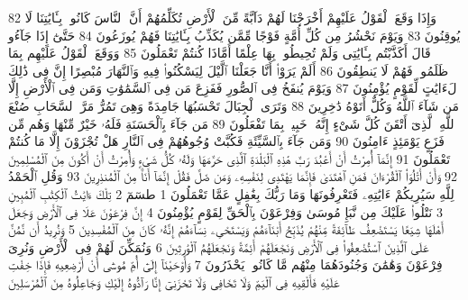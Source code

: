 {\tiny\colorbox{cl_aya}{82}} وَإِذَا وَقَعَ ٱلْقَوْلُ عَلَيْهِمْ أَخْرَجْنَا لَهُمْ دَآبَّةً مِّنَ ٱلْأَرْضِ تُكَلِّمُهُمْ أَنَّ ٱلنَّاسَ كَانُوا۟ بِـَٔايَٰتِنَا لَا يُوقِنُونَ
{\tiny\colorbox{cl_aya}{83}} وَيَوْمَ نَحْشُرُ مِن كُلِّ أُمَّةٍ فَوْجًا مِّمَّن يُكَذِّبُ بِـَٔايَٰتِنَا فَهُمْ يُوزَعُونَ
{\tiny\colorbox{cl_aya}{84}} حَتَّىٰٓ إِذَا جَآءُو قَالَ أَكَذَّبْتُم بِـَٔايَٰتِى وَلَمْ تُحِيطُوا۟ بِهَا عِلْمًا أَمَّاذَا كُنتُمْ تَعْمَلُونَ
{\tiny\colorbox{cl_aya}{85}} وَوَقَعَ ٱلْقَوْلُ عَلَيْهِم بِمَا ظَلَمُوا۟ فَهُمْ لَا يَنطِقُونَ
{\tiny\colorbox{cl_aya}{86}} أَلَمْ يَرَوْا۟ أَنَّا جَعَلْنَا ٱلَّيْلَ لِيَسْكُنُوا۟ فِيهِ وَٱلنَّهَارَ مُبْصِرًا إِنَّ فِى ذَٰلِكَ لَءَايَٰتٍ لِّقَوْمٍ يُؤْمِنُونَ
{\tiny\colorbox{cl_aya}{87}} وَيَوْمَ يُنفَخُ فِى ٱلصُّورِ فَفَزِعَ مَن فِى ٱلسَّمَٰوَٰتِ وَمَن فِى ٱلْأَرْضِ إِلَّا مَن شَآءَ ٱللَّهُ وَكُلٌّ أَتَوْهُ دَٰخِرِينَ
{\tiny\colorbox{cl_aya}{88}} وَتَرَى ٱلْجِبَالَ تَحْسَبُهَا جَامِدَةً وَهِىَ تَمُرُّ مَرَّ ٱلسَّحَابِ صُنْعَ ٱللَّهِ ٱلَّذِىٓ أَتْقَنَ كُلَّ شَىْءٍ إِنَّهُۥ خَبِيرٌۢ بِمَا تَفْعَلُونَ
{\tiny\colorbox{cl_aya}{89}} مَن جَآءَ بِٱلْحَسَنَةِ فَلَهُۥ خَيْرٌ مِّنْهَا وَهُم مِّن فَزَعٍ يَوْمَئِذٍ ءَامِنُونَ
{\tiny\colorbox{cl_aya}{90}} وَمَن جَآءَ بِٱلسَّيِّئَةِ فَكُبَّتْ وُجُوهُهُمْ فِى ٱلنَّارِ هَلْ تُجْزَوْنَ إِلَّا مَا كُنتُمْ تَعْمَلُونَ
{\tiny\colorbox{cl_aya}{91}} إِنَّمَآ أُمِرْتُ أَنْ أَعْبُدَ رَبَّ هَٰذِهِ ٱلْبَلْدَةِ ٱلَّذِى حَرَّمَهَا وَلَهُۥ كُلُّ شَىْءٍ وَأُمِرْتُ أَنْ أَكُونَ مِنَ ٱلْمُسْلِمِينَ
{\tiny\colorbox{cl_aya}{92}} وَأَنْ أَتْلُوَا۟ ٱلْقُرْءَانَ فَمَنِ ٱهْتَدَىٰ فَإِنَّمَا يَهْتَدِى لِنَفْسِهِۦ وَمَن ضَلَّ فَقُلْ إِنَّمَآ أَنَا۠ مِنَ ٱلْمُنذِرِينَ
{\tiny\colorbox{cl_aya}{93}} وَقُلِ ٱلْحَمْدُ لِلَّهِ سَيُرِيكُمْ ءَايَٰتِهِۦ فَتَعْرِفُونَهَا وَمَا رَبُّكَ بِغَٰفِلٍ عَمَّا تَعْمَلُونَ
{\tiny\colorbox{cl_aya}{1}} طسٓمٓ
{\tiny\colorbox{cl_aya}{2}} تِلْكَ ءَايَٰتُ ٱلْكِتَٰبِ ٱلْمُبِينِ
{\tiny\colorbox{cl_aya}{3}} نَتْلُوا۟ عَلَيْكَ مِن نَّبَإِ مُوسَىٰ وَفِرْعَوْنَ بِٱلْحَقِّ لِقَوْمٍ يُؤْمِنُونَ
{\tiny\colorbox{cl_aya}{4}} إِنَّ فِرْعَوْنَ عَلَا فِى ٱلْأَرْضِ وَجَعَلَ أَهْلَهَا شِيَعًا يَسْتَضْعِفُ طَآئِفَةً مِّنْهُمْ يُذَبِّحُ أَبْنَآءَهُمْ وَيَسْتَحْىِۦ نِسَآءَهُمْ إِنَّهُۥ كَانَ مِنَ ٱلْمُفْسِدِينَ
{\tiny\colorbox{cl_aya}{5}} وَنُرِيدُ أَن نَّمُنَّ عَلَى ٱلَّذِينَ ٱسْتُضْعِفُوا۟ فِى ٱلْأَرْضِ وَنَجْعَلَهُمْ أَئِمَّةً وَنَجْعَلَهُمُ ٱلْوَٰرِثِينَ
{\tiny\colorbox{cl_aya}{6}} وَنُمَكِّنَ لَهُمْ فِى ٱلْأَرْضِ وَنُرِىَ فِرْعَوْنَ وَهَٰمَٰنَ وَجُنُودَهُمَا مِنْهُم مَّا كَانُوا۟ يَحْذَرُونَ
{\tiny\colorbox{cl_aya}{7}} وَأَوْحَيْنَآ إِلَىٰٓ أُمِّ مُوسَىٰٓ أَنْ أَرْضِعِيهِ فَإِذَا خِفْتِ عَلَيْهِ فَأَلْقِيهِ فِى ٱلْيَمِّ وَلَا تَخَافِى وَلَا تَحْزَنِىٓ إِنَّا رَآدُّوهُ إِلَيْكِ وَجَاعِلُوهُ مِنَ ٱلْمُرْسَلِينَ
